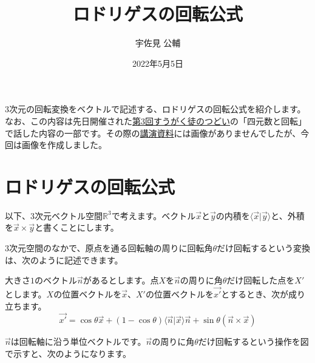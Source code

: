 \documentclass{jlreq}
\title{ロドリゲスの回転公式}
\author{宇佐見 公輔}
\date{2022年5月5日}
\numberwithin{equation}{section}
\begin{document}
\maketitle

3次元の回転変換をベクトルで記述する、ロドリゲスの回転公式を紹介します。なお、この内容は先日開催された\href{https://tsudoionline.netlify.app/03/}{第3回すうがく徒のつどい}の「四元数と回転」で話した内容の一部です。その際の\href{https://github.com/usami-k/mathematics/blob/master/2022/QuaternionRotationTsudoi/QuaternionRotationTsudoi.pdf}{講演資料}には画像がありませんでしたが、今回は画像を作成しました。

\section{ロドリゲスの回転公式}

以下、3次元ベクトル空間$\mathbb{R}^3$で考えます。ベクトル$\vec{x}$と$\vec{y}$の内積を$\langle\vec{x}|\vec{y}\rangle$と、外積を$\vec{x}\times\vec{y}$と書くことにします。

3次元空間のなかで、原点を通る回転軸の周りに回転角$\theta$だけ回転するという変換は、次のように記述できます。

\begin{theorem}[ロドリゲスの回転公式]
    大きさ$1$のベクトル$\vec{n}$があるとします。点$X$を$\vec{n}$の周りに角$\theta$だけ回転した点を$X'$とします。$X$の位置ベクトルを$\vec{x}$、$X'$の位置ベクトルを$\vec{x'}$とするとき、次が成り立ちます。
    \begin{equation}
        \vec{x'}=\cos\theta\vec{x}+(1-\cos\theta)\langle\vec{n}|\vec{x}\rangle\vec{n}+\sin\theta(\vec{n}\times\vec{x})
    \end{equation}
\end{theorem}

$\vec{n}$は回転軸に沿う単位ベクトルです。$\vec{n}$の周りに角$\theta$だけ回転するという操作を図で示すと、次のようになります。
\end{document}
